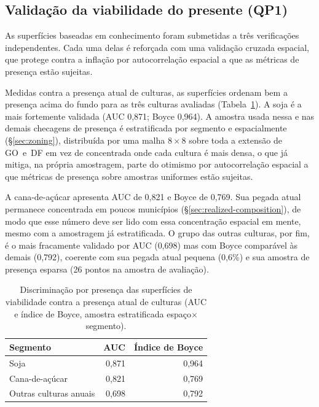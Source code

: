 \subsection{Validação da viabilidade do presente (QP1)}\label{sec:validation-present}

As superfícies baseadas em conhecimento foram submetidas a três verificações independentes.
Cada uma delas é reforçada com uma validação cruzada espacial, que protege contra a inflação
por autocorrelação espacial a que as métricas de presença estão sujeitas.


Medidas contra a presença atual de culturas, as
superfícies ordenam bem a presença acima do fundo para as três culturas avaliadas
(Tabela~\ref{tab:presence-auc}). A soja é a mais fortemente validada (AUC 0,871; Boyce 0,964).
A amostra usada nessa e nas demais checagens de presença é estratificada por segmento e espacialmente
(\S\ref{sec:zoning}), distribuída por uma malha $8\times8$ sobre toda a extensão de
GO~e~DF em vez de concentrada onde cada cultura é mais densa, o que já mitiga, na própria
amostragem, parte do otimismo por autocorrelação espacial a que métricas de presença sobre
amostras uniformes estão sujeitas.

A cana-de-açúcar apresenta AUC de 0,821 e Boyce de 0,769. Sua pegada atual permanece concentrada
em poucos municípios (\S\ref{sec:realized-composition}), de modo que esse número deve ser lido
com essa concentração espacial em mente, mesmo com a amostragem já estratificada. O grupo das
outras culturas, por fim, é o mais fracamente validado por AUC (0,698) mas com Boyce comparável
às demais (0,792), coerente com sua pegada atual pequena (0,6\%) e sua amostra de presença
esparsa (26 pontos na amostra de avaliação).

\begin{table}[H]
\centering
\caption{Discriminação por presença das superfícies de viabilidade contra a presença atual
de culturas (AUC e índice de Boyce, amostra estratificada espaço$\times$segmento).}
\label{tab:presence-auc}
\begin{tabular}{@{}lrr@{}}
\toprule
Segmento & AUC & Índice de Boyce \\
\midrule
Soja                 & 0,871 & 0,964 \\
Cana-de-açúcar       & 0,821 & 0,769 \\
Outras culturas anuais & 0,698 & 0,792 \\
\bottomrule
\end{tabular}
\end{table}

